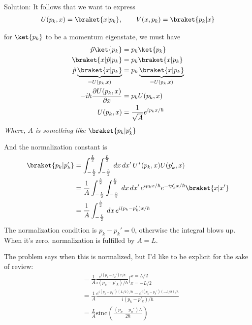 \begin{homeworkProblem}
\begin{enumerate}[(a)]
\begin{callout}{Solution:}
                It follows that we want to express
                \begin{align*}
                    U(p_k, x) = \braket{x|p_k}, \qquad V(x, p_k) = \braket{p_k|x}
                \end{align*}

                for $\ket{p_k}$ to be a momentum eigenstate, we must have
                \begin{align*}
                    \hat{p} \ket{p_k} &= p_k\ket{p_k} \\
                    \braket{x|\hat{p}|p_k} &= p_k\braket{x|p_k} \\
                    \hat{p}\underbrace{\braket{x|p_k}}_{=U(p_k, x)} &= p_k\underbrace{\braket{x|p_k}}_{=U(p_k, x)} \\
                    -i \hbar \frac{\partial U(p_k, x)}{\partial x} &= p_k U(p_k, x) \\
                    U(p_k, x) &= \frac{1}{\sqrt{A}} e^{i p_k x / \hbar}
                \end{align*}
                \textit{Where, $A$ is something like $\braket{p_k|p_k'}$}

                And the normalization constant is 
                \begin{align*}
                    \braket{p_k | p_k'} &= \int_{-\frac{L}{2}}^{\frac{L}{2}}  \int_{-\frac{L}{2}}^{\frac{L}{2}}\,dx\,dx'
                    \, U^*(p_k, x)U(p_k', x) \\
                                        &= \frac{1}{A} \int_{-\frac{L}{2}}^{\frac{L}{2}}  \int_{-\frac{L}{2}}^{\frac{L}{2}}\,dx\,dx'
                                        \, e^{ip_k x / \hbar} e^{-ip_k' x / \hbar} \braket{x|x'} \\
                                        &= \frac{1}{A} \int_{-\frac{L}{2}}^{\frac{L}{2}} \,dx
                                        \, e^{i(p_k-p_k') x / \hbar} \\
                \end{align*}
                The normalization condition is $p_k - p_k' = 0$, otherwise the integral blows up. When it's zero, normalization is fulfilled by $A=L$.

                The problem says when this is normalized, but I'd like to be explicit for the sake of review:
                \begin{align*}
                &= \frac{1}{A} \frac{e^{i(p_k-p_k') x / \hbar}}{i(p_k - p'_k) / \hbar}\Bigg|_{x = - L / 2}^{x = L / 2}\\
                &= \frac{1}{A} \frac{e^{i(p_k-p_k') (L / 2) / \hbar} - e^{i(p_k-p_k') (- L / 2) / \hbar}}{i(p_k - p'_k) / \hbar} \\
                &= \frac{L}{A} \text{sinc} \left( \frac{(p_k - p_k')L}{2\hbar} \right)
                \end{align*}


\end{callout}
\end{enumerate}
\end{homeworkProblem}
